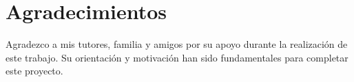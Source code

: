 {}
\section*{Agradecimientos}
Agradezco a mis tutores, familia y amigos por su apoyo durante la realización de este trabajo. Su orientación y motivación han sido fundamentales para completar este proyecto.
